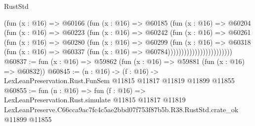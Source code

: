 \begin{lexlean}{RustStd}
\begin{coremodule}
                              (fun (x : @16) =>
                              @60166
                                (fun (x : @16) =>
                                @60185
                                  (fun (x : @16) =>
                                  @60204
                                    (fun (x : @16) =>
                                    @60223
                                      (fun (x : @16) =>
                                      @60242
                                        (fun (x : @16) =>
                                        @60261
                                          (fun (x : @16) =>
                                          @60280
                                            (fun (x : @16) =>
                                            @60299
                                              (fun (x : @16) =>
                                              @60318
                                                (fun (x : @16) =>
                                                @60337
                                                  (fun (x : @16) => @60784))))))))))))))))))))))))
@60837 := fun (x : @16) => @59862 (fun (x : @16) => @59881 (fun (x : @16) => @60832))
@60845 := (n : @16) ->
  (f : @16) -> LexLeanPreservation.Rust.FunSem @11815 @11817 @11819 @11899 @11855
@60855 := fun (n : @16) =>
  fun (f : @16) =>
  LexLeanPreservation.Rust.simulate
    @11815
    @11817
    @11819
    LexLeanPreserve.C66cca9ac7fc4c5ae2bbd07f753f87b5b.R38.RustStd.crate_ok
    @11899
    @11855
\end{coremodule}
\end{lexlean}
